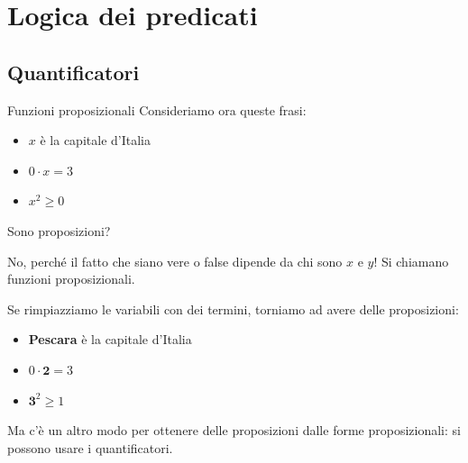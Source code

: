 \documentclass[aspectratio=169,10pt]{beamer}
\begin{document}

\section{Logica dei predicati}

\subsection{Quantificatori}

\begin{frame}{Funzioni proposizionali}
    Consideriamo ora queste frasi:
    \begin{itemize}
        \item $x$ è la capitale d'Italia
        \item $0 \cdot x = 3$\\
        \item $x^2 \geq 0$
    \end{itemize}
    Sono proposizioni?
    \medskip

    \pause
    No, perché il fatto che siano vere o false dipende da chi sono $x$ e $y$! Si chiamano \alert{funzioni proposizionali}. \medskip

    Se rimpiazziamo le variabili con dei \alert{termini}, torniamo ad avere delle proposizioni:
    \begin{itemize}
        \item \textbf{Pescara} è la capitale d'Italia
        \item $0 \cdot \mathbf{2} = 3$
        \item $\mathbf{3}^2 \geq 1$
    \end{itemize}

     Ma c'è un altro modo per ottenere delle proposizioni dalle forme proposizionali: si possono usare i \alert{quantificatori}.\medskip
\end{frame}
\end{document}

